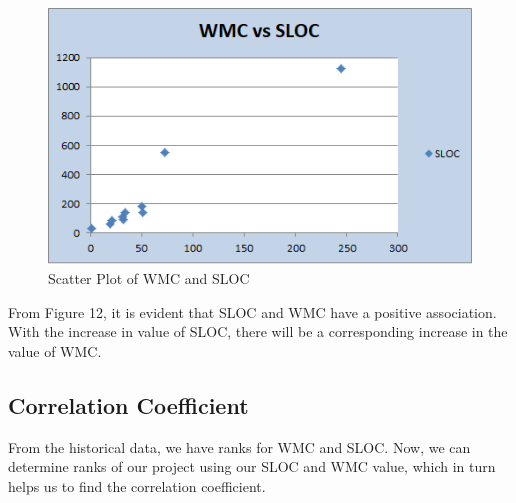 \documentclass[a4paper, 11pt]{article}
\begin{document}
\begin{figure}[!hbt]
		\begin{center}
		\includegraphics[width=\columnwidth]{Scatter1.png}
		\caption{Scatter Plot of WMC and SLOC}
		\label{fig:figure}
		\end{center}
	\end{figure}
From Figure 12, it is evident that SLOC and WMC have a positive association. With the increase in value of SLOC, there will be a corresponding increase in the value of WMC.
\subsection{Correlation Coefficient}
From the historical data, we have ranks for WMC and SLOC. Now, we can determine ranks of our project using our SLOC and WMC value, which in turn helps us to find the correlation coefficient. \\
\end{document}
